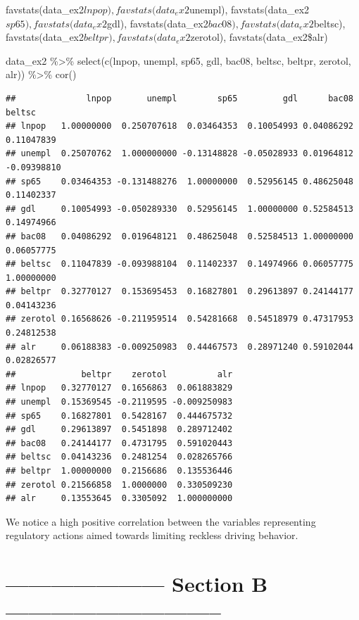 \documentclass[
]{article}
\newenvironment{Shaded}{\begin{snugshade}}{\end{snugshade}}
\newcommand{\FunctionTok}[1]{\textcolor[rgb]{0.00,0.00,0.00}{#1}}
\newcommand{\NormalTok}[1]{#1}
\newcommand{\SpecialCharTok}[1]{\textcolor[rgb]{0.00,0.00,0.00}{#1}}
\begin{document}
favstats(data\_ex2\(lnpop),  favstats(data_ex2\)unempl),
favstats(data\_ex2\(sp65),  favstats(data_ex2\)gdl),
favstats(data\_ex2\(bac08),  favstats(data_ex2\)beltsc),
favstats(data\_ex2\(beltpr),  favstats(data_ex2\)zerotol),
favstats(data\_ex2\$alr)

\begin{Shaded}
\begin{Highlighting}[]
\NormalTok{data\_ex2 }\SpecialCharTok{\%\textgreater{}\%} \FunctionTok{select}\NormalTok{(}\FunctionTok{c}\NormalTok{(lnpop, unempl, sp65, gdl, bac08, beltsc, beltpr, zerotol, alr)) }\SpecialCharTok{\%\textgreater{}\%} \FunctionTok{cor}\NormalTok{()}
\end{Highlighting}
\end{Shaded}

\begin{verbatim}
##              lnpop       unempl        sp65         gdl      bac08      beltsc
## lnpop   1.00000000  0.250707618  0.03464353  0.10054993 0.04086292  0.11047839
## unempl  0.25070762  1.000000000 -0.13148828 -0.05028933 0.01964812 -0.09398810
## sp65    0.03464353 -0.131488276  1.00000000  0.52956145 0.48625048  0.11402337
## gdl     0.10054993 -0.050289330  0.52956145  1.00000000 0.52584513  0.14974966
## bac08   0.04086292  0.019648121  0.48625048  0.52584513 1.00000000  0.06057775
## beltsc  0.11047839 -0.093988104  0.11402337  0.14974966 0.06057775  1.00000000
## beltpr  0.32770127  0.153695453  0.16827801  0.29613897 0.24144177  0.04143236
## zerotol 0.16568626 -0.211959514  0.54281668  0.54518979 0.47317953  0.24812538
## alr     0.06188383 -0.009250983  0.44467573  0.28971240 0.59102044  0.02826577
##             beltpr    zerotol          alr
## lnpop   0.32770127  0.1656863  0.061883829
## unempl  0.15369545 -0.2119595 -0.009250983
## sp65    0.16827801  0.5428167  0.444675732
## gdl     0.29613897  0.5451898  0.289712402
## bac08   0.24144177  0.4731795  0.591020443
## beltsc  0.04143236  0.2481254  0.028265766
## beltpr  1.00000000  0.2156686  0.135536446
## zerotol 0.21566858  1.0000000  0.330509230
## alr     0.13553645  0.3305092  1.000000000
\end{verbatim}

We notice a high positive correlation between the variables representing
regulatory actions aimed towards limiting reckless driving behavior.

\hypertarget{section-b}{%
\section{--------------------- Section B
-----------------------------}\label{section-b}}
\end{document}
